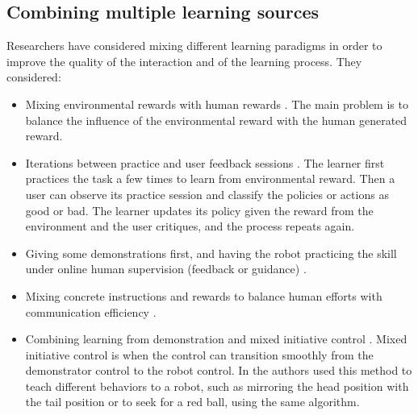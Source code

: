 \subsection{Combining multiple learning sources}

Researchers have considered mixing different learning paradigms in order to improve the quality of the interaction and of the learning process. They considered:

\begin{itemize}

\item Mixing environmental rewards with human rewards \cite{knox2010combining,griffith2013policy,grave2013learning}. The main problem is to balance the influence of the environmental reward with the human generated reward.

\item Iterations between practice and user feedback sessions \cite{judah2010reinforcement}. The learner first practices the task a few times to learn from environmental reward. Then a user can observe its practice session and classify the policies or actions as good or bad. The learner updates its policy given the reward from the environment and the user critiques, and the process repeats again.

\item Giving some demonstrations first, and having the robot practicing the skill under online human supervision (feedback or guidance) \cite{nicolescu2003natural,pardowitz2007incremental}.

\item Mixing concrete instructions and rewards to balance human efforts with communication efficiency \cite{pilarski2012between}.

\item Combining learning from demonstration and mixed initiative control \cite{grollman2007dogged}. Mixed initiative control is when the control can transition smoothly from the demonstrator control to the robot control. In \cite{grollman2007dogged} the authors used this method to teach different behaviors to a robot, such as mirroring the head position with the tail position or to seek for a red ball, using the same algorithm.


\end{itemize}
